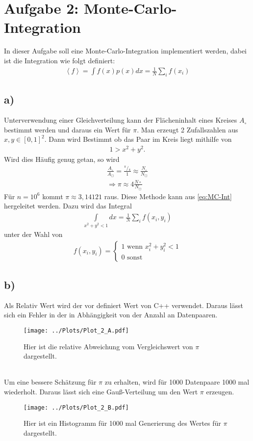 
\section*{Aufgabe 2: Monte-Carlo-Integration}
In dieser Aufgabe soll eine Monte-Carlo-Integration implementiert werden, dabei ist die Integration wie folgt definiert:
\begin{align}
	\left< f \right> = \int f(x) p(x)dx = \frac{1}{N}\sum\limits_{i} f(x_i)\label{eq:MC-Int}
\end{align}
\subsection*{a)}
Unterverwendung einer Gleichverteilung kann der Flächeninhalt eines Kreises $A_\circ$ bestimmt werden und daraus ein Wert für $\pi$.
Man erzeugt 2 Zufallszahlen aus $x,y\in[0,1]^2$.
Dann wird Bestimmt ob das Paar im Kreis liegt mithilfe von
\begin{align}
	1>x^2+y^2.
\end{align}
Wird dies Häufig genug getan, so wird
\begin{align}
	\frac{A_\circ}{A_\Box}=\frac{{}^\pi\!/\!_4}{1}\approx\frac{N_\circ}{N_\Box}\\
	\Rightarrow \pi \approx 4\frac{N\circ}{N_\Box}
\end{align}
Für $n=10^6$ kommt $\pi\approx 3,14121$ raus.
Diese Methode kann aus \cref{eq:MC-Int} hergeleitet werden.
Dazu wird das Integral
\begin{align}
	\int\limits_{x^2+y^2<1} dx = \frac{1}{N}\sum\limits_{i}f(x_i,y_i)
\end{align}
unter der Wahl von
\begin{align}
f(x_i,y_i)=\begin{cases}
	1\text{ wenn } x_i^2+y_i^2<1\\
	0 \text{ sonst}
\end{cases}
\end{align} \newpage
\subsection*{b)}
Als Relativ Wert wird der vor definiert Wert von C++ verwendet.
Daraus lässt sich ein Fehler in der in Abhängigkeit von der Anzahl an Datenpaaren.
\begin{figure}[h!]
	\centering
	\texttt{[image: ../Plots/Plot\_2\_A.pdf]}
	\caption{Hier ist die relative Abweichung vom Vergleichswert von $\pi$ dargestellt.}
\end{figure} \\
Um eine bessere Schätzung für $\pi$ zu erhalten, wird für 1000 Datenpaare 1000 mal wiederholt. Daraus lässt sich eine Gauß-Verteilung um den Wert $\pi$ erzeugen.
\begin{figure}[h!]
	\centering
	\texttt{[image: ../Plots/Plot\_2\_B.pdf]}
	\caption{Hier ist ein Histogramm für 1000 mal Generierung des Wertes für $\pi$ dargestellt.}
\end{figure}\newpage
